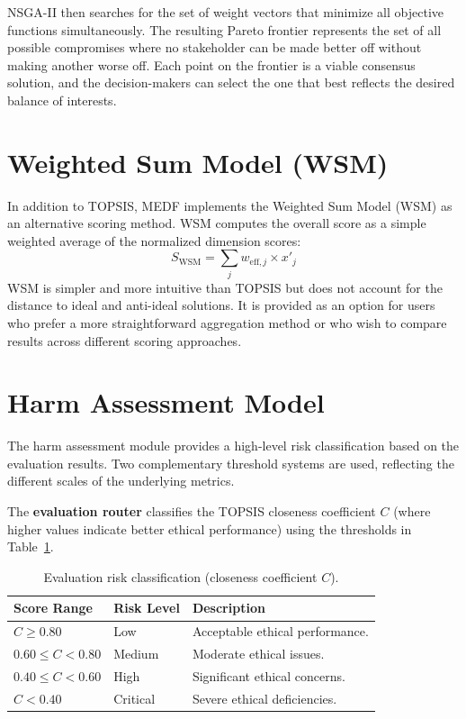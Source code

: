 NSGA-II then searches for the set of weight vectors that minimize all objective functions simultaneously. The resulting Pareto frontier represents the set of all possible compromises where no stakeholder can be made better off without making another worse off. Each point on the frontier is a viable consensus solution, and the decision-makers can select the one that best reflects the desired balance of interests.

\section{Weighted Sum Model (WSM)}
\label{sec:wsm}

In addition to TOPSIS, MEDF implements the Weighted Sum Model (WSM) as an alternative scoring method. WSM computes the overall score as a simple weighted average of the normalized dimension scores:
\begin{equation}
  S_{\mathrm{WSM}} = \sum_{j} w_{\mathrm{eff},j} \times x'_j
  \label{eq:wsm}
\end{equation}
WSM is simpler and more intuitive than TOPSIS but does not account for the distance to ideal and anti-ideal solutions. It is provided as an option for users who prefer a more straightforward aggregation method or who wish to compare results across different scoring approaches.

\section{Harm Assessment Model}
\label{sec:harm}

The harm assessment module provides a high-level risk classification based on the evaluation results. Two complementary threshold systems are used, reflecting the different scales of the underlying metrics.

The \textbf{evaluation router} classifies the TOPSIS closeness coefficient $C$ (where higher values indicate better ethical performance) using the thresholds in Table~\ref{tab:risk_levels_eval}.

\begin{table}[H]
\centering
\caption{Evaluation risk classification (closeness coefficient $C$).}
\label{tab:risk_levels_eval}
\begin{tabular}{@{}lll@{}}
\toprule
\textbf{Score Range} & \textbf{Risk Level} & \textbf{Description} \\
\midrule
$C \geq 0.80$ & Low & Acceptable ethical performance. \\
$0.60 \leq C < 0.80$ & Medium & Moderate ethical issues. \\
$0.40 \leq C < 0.60$ & High & Significant ethical concerns. \\
$C < 0.40$ & Critical & Severe ethical deficiencies. \\
\bottomrule
\end{tabular}
\end{table}

